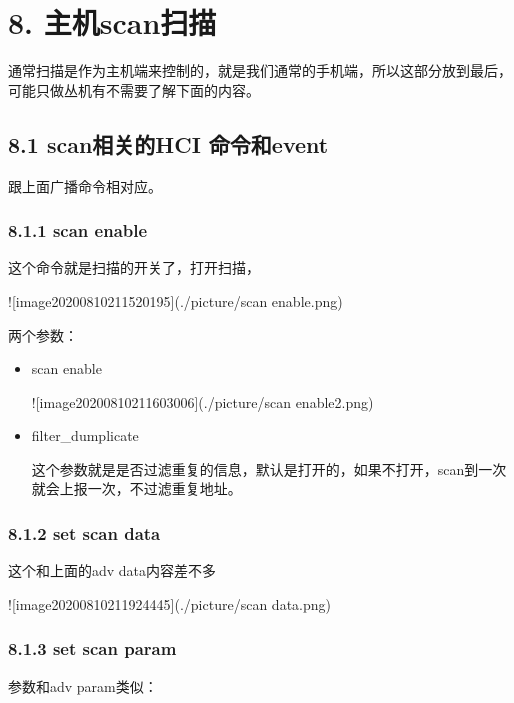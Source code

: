 \documentclass[letterpaper,10pt,english]{sphinxmanual}
\begin{document}
\section{8. 主机scan扫描}
\label{\detokenize{test/ble_adv_scan_all:scan}}
通常扫描是作为主机端来控制的，就是我们通常的手机端，所以这部分放到最后，可能只做丛机有不需要了解下面的内容。


\subsection{8.1 scan相关的HCI 命令和event}
\label{\detokenize{test/ble_adv_scan_all:scanhci-event}}
跟上面广播命令相对应。


\subsubsection{8.1.1 scan enable}
\label{\detokenize{test/ble_adv_scan_all:scan-enable}}
这个命令就是扫描的开关了，打开扫描，

!{[}image\sphinxhyphen{}20200810211520195{]}(./picture/scan enable.png)

两个参数：
\begin{itemize}
\item {} 
scan enable

!{[}image\sphinxhyphen{}20200810211603006{]}(./picture/scan enable2.png)

\item {} 
filter\_dumplicate

这个参数就是是否过滤重复的信息，默认是打开的，如果不打开，scan到一次就会上报一次，不过滤重复地址。


\end{itemize}


\subsubsection{8.1.2 set scan data}
\label{\detokenize{test/ble_adv_scan_all:set-scan-data}}
这个和上面的adv data内容差不多

!{[}image\sphinxhyphen{}20200810211924445{]}(./picture/scan data.png)


\subsubsection{8.1.3 set scan param}
\label{\detokenize{test/ble_adv_scan_all:set-scan-param}}
参数和adv param类似：
\end{document}
